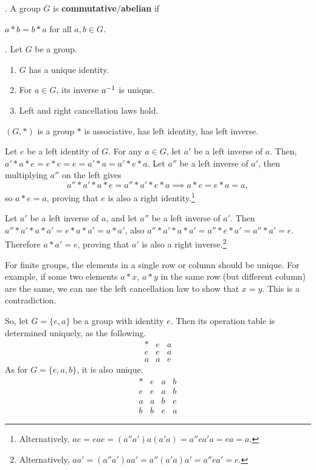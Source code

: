 .  A group \(G\) is \textbf{commutative}/\textbf{abelian} if
\begin{center}
    \(a * b = b * a\) for all \(a, b \in G\).
\end{center}

\prop.  Let \(G\) be a group.
\begin{enumerate}
    \item \(G\) has a unique identity.
    \item For \(a \in G\), its inverse \(a^{-1}\) is unique.
    \item Left and right cancellation laws hold.
\end{enumerate}

\rmk \((G, *)\) is a group \miff \(*\) is associative, has left identity, has left inverse.

\pf \note{\mimpd} Let \(e\) be a left identity of \(G\). For any \(a \in G\), let \(a'\) be a left inverse of \(a\). Then, \(a' * a * e = e * e = e = a' * a = a' * e * a\). Let \(a''\) be a left inverse of \(a'\), then multiplying \(a''\) on the left gives
\[
    a'' * a' * a * e = a'' * a' * e * a \implies a * e = e * a = a,
\]
so \(a * e = a\), proving that \(e\) is also a right identity.\footnote{Alternatively, \(a e = e a e = (a'' a') a (a' a) = a'' e a' a = e a = a\).}

Let \(a'\) be a left inverse of \(a\), and let \(a''\) be a left inverse of \(a'\). Then \(a'' * a' * a * a' = e * a * a' = a * a'\), also \(a'' * a' * a * a' = a'' * e * a' = a'' * a' = e\). Therefore \(a * a' = e\), proving that \(a'\) is also a right inverse.\footnote{Alternatively, \(aa' = (a'' a')a a' = a'' (a' a) a' = a'' e a' = e\).}

\rmk For finite groups, the elements in a single row or column should be unique. For example, if some two elements \(a * x\), \(a * y\) in the same row (but different column) are the same, we can use the left cancellation law to show that \(x = y\). This is a contradiction.

So, let \(G = \{e, a\}\) be a group with identity \(e\). Then its operation table is determined uniquely, as the following.
\[
    \begin{array}{c|c|c}
        * & e & a \\ \hline
        e & e & a \\ \hline
        a & a & e
    \end{array}
\]
As for \(G = \{e, a, b\}\), it is also unique.
\[
    \begin{array}{c|c|c|c}
        * & e & a & b \\ \hline
        e & e & a & b \\ \hline
        a & a & b & e \\ \hline
        b & b & e & a
    \end{array}
\]

\pagebreak
